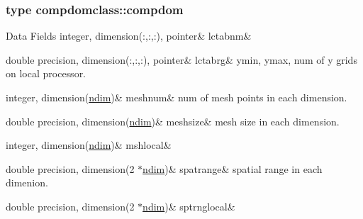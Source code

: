 \subsubsection{type compdomclass\+::compdom}
\begin{DoxyFields}{Data Fields}
\mbox{\label{namespacecompdomclass_aebcef97b10bb06dc69848b22acaffe70}} 
integer, dimension(:,:,:), pointer&
lctabnm&
\\
\hline

\mbox{\label{namespacecompdomclass_a339ff58ad4edb52e01cf217b9a7f081c}} 
double precision, dimension(:,:,:), pointer&
lctabrg&
ymin, ymax, num of y grids on local processor. \\
\hline

\mbox{\label{namespacecompdomclass_a80b917ff817964bc120175119768f93e}} 
integer, dimension(\mbox{\hyperlink{namespacecompdomclass_a01f031d8af670f66db4484cd6411e99f}{ndim}})&
meshnum&
num of mesh points in each dimension. \\
\hline

\mbox{\label{namespacecompdomclass_a13c6277e9ca60fa6a80081b2a0bc91ff}} 
double precision, dimension(\mbox{\hyperlink{namespacecompdomclass_a01f031d8af670f66db4484cd6411e99f}{ndim}})&
meshsize&
mesh size in each dimension. \\
\hline

\mbox{\label{namespacecompdomclass_a21d05738eabd33f56f26879055af6343}} 
integer, dimension(\mbox{\hyperlink{namespacecompdomclass_a01f031d8af670f66db4484cd6411e99f}{ndim}})&
mshlocal&
\\
\hline

\mbox{\label{namespacecompdomclass_a55068267999d67699122c91b366a0682}} 
double precision, dimension(2 $\ast$\mbox{\hyperlink{namespacecompdomclass_a01f031d8af670f66db4484cd6411e99f}{ndim}})&
spatrange&
spatial range in each dimenion. \\
\hline

\mbox{\label{namespacecompdomclass_a2a2654ff7dd41dbb57b11a089e568123}} 
double precision, dimension(2 $\ast$\mbox{\hyperlink{namespacecompdomclass_a01f031d8af670f66db4484cd6411e99f}{ndim}})&
sptrnglocal&
\\
\hline

\end{DoxyFields}
